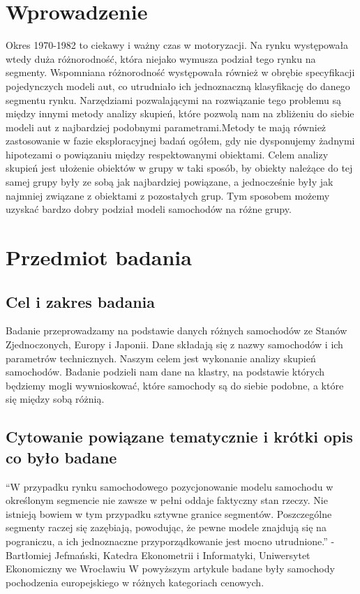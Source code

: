 \documentclass{article}
\begin{document}
\section{Wprowadzenie}
Okres 1970-1982 to ciekawy i ważny czas w motoryzacji. Na rynku występowała wtedy duża różnorodność, która niejako wymusza podział tego rynku na segmenty. Wspomniana różnorodność występowała również w obrębie specyfikacji pojedynczych modeli aut, co utrudniało ich jednoznaczną klasyfikację do danego segmentu rynku. Narzędziami pozwalającymi na rozwiązanie tego problemu są między innymi metody analizy skupień, które pozwolą nam na zbliżeniu do siebie modeli aut z najbardziej podobnymi parametrami.Metody te mają również zastosowanie w fazie eksploracyjnej badań ogółem, gdy nie dysponujemy żadnymi hipotezami o powiązaniu między respektowanymi obiektami. Celem analizy skupień jest ułożenie obiektów w grupy w taki sposób, by obiekty należące do tej samej grupy były ze sobą jak najbardziej powiązane, a jednocześnie były jak najmniej związane z obiektami z pozostałych grup. Tym sposobem możemy uzyskać bardzo dobry podział modeli samochodów na różne grupy.
\section{Przedmiot badania}
    \subsection{Cel i zakres badania} 
    Badanie przeprowadzamy na podstawie danych różnych samochodów ze Stanów Zjednoczonych, Europy i Japonii. 
    Dane składają się z nazwy samochodów i ich parametrów technicznych.
    \newline\newline
    Naszym celem jest wykonanie analizy skupień samochodów. Badanie podzieli nam dane na klastry, na podstawie których będziemy mogli 
    wywnioskować, które samochody są do siebie podobne, a które się między sobą różnią. 
    \newline
    \subsection{Cytowanie powiązane tematycznie i krótki opis co było badane}
    ``W przypadku rynku samochodowego pozycjonowanie modelu samochodu w określonym segmencie nie zawsze w pełni oddaje faktyczny stan rzeczy. Nie istnieją bowiem w tym przypadku sztywne granice segmentów. Poszczególne segmenty raczej się zazębiają, powodując, że pewne modele znajdują się na pograniczu, a ich jednoznaczne przyporządkowanie jest mocno utrudnione.'' \newline- Bartłomiej Jefmański, Katedra Ekonometrii i Informatyki, Uniwersytet Ekonomiczny we Wrocławiu
    \newline\newline
    W powyższym artykule badane były samochody pochodzenia europejskiego w różnych kategoriach cenowych.
\end{document}
